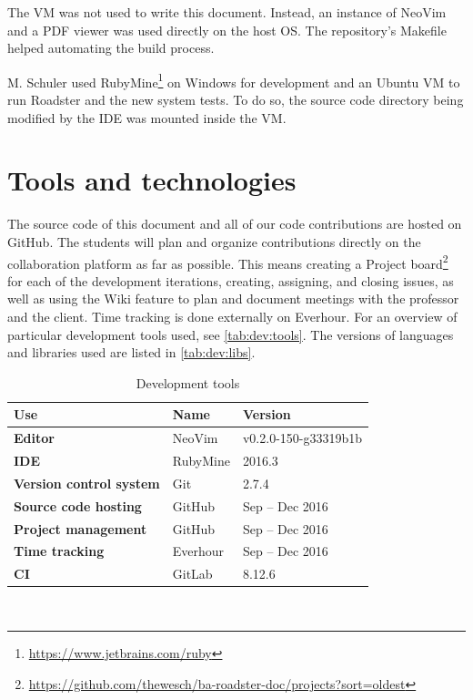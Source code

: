 \documentclass[a4paper]{report}
\begin{document}
The VM was not used to write this document. Instead, an instance of NeoVim and
a PDF viewer was used directly on the host OS. The repository's Makefile helped
automating the build process.

M. Schuler used RubyMine\footnote{\url{https://www.jetbrains.com/ruby}} on Windows for development and an Ubuntu VM to run
Roadster and the new system tests. To do so, the source code directory being
modified by the IDE was mounted inside the VM.

\section{Tools and technologies}
The source code of this document and all of our code contributions are hosted
on GitHub. The students will plan and organize contributions directly on the
collaboration platform as far as possible. This means creating a Project board\footnote{\url{https://github.com/thewesch/ba-roadster-doc/projects?sort=oldest}} for each of the
development iterations, creating, assigning, and closing issues, as well as using
the Wiki feature to plan and document meetings with the professor and the
client. Time tracking is done externally on Everhour. For an overview of
particular development tools used, see \autoref{tab:dev:tools}.
The versions of languages and libraries used are listed in \autoref{tab:dev:libs}.


\begin{table}[]
  \centering
  \begin{tabular}{|p{50mm}|p{35mm}|p{35mm}|}
    \hline
    \bf Use & \bf Name & \bf Version \\ \hline
    \bf Editor & NeoVim & v0.2.0-150-g33319b1b \\ \hline
    \bf IDE & RubyMine & 2016.3 \\ \hline
    \bf Version control system & Git & 2.7.4 \\ \hline
    \bf Source code hosting & GitHub & Sep -- Dec 2016 \\ \hline
    \bf Project management & GitHub & Sep -- Dec 2016 \\ \hline
    \bf Time tracking & Everhour & Sep -- Dec 2016 \\ \hline
    \bf CI & GitLab & 8.12.6 \\ \hline
  \end{tabular} \\
  \caption{Development tools}
  \label{tab:dev:tools}
\end{table}
\end{document}
